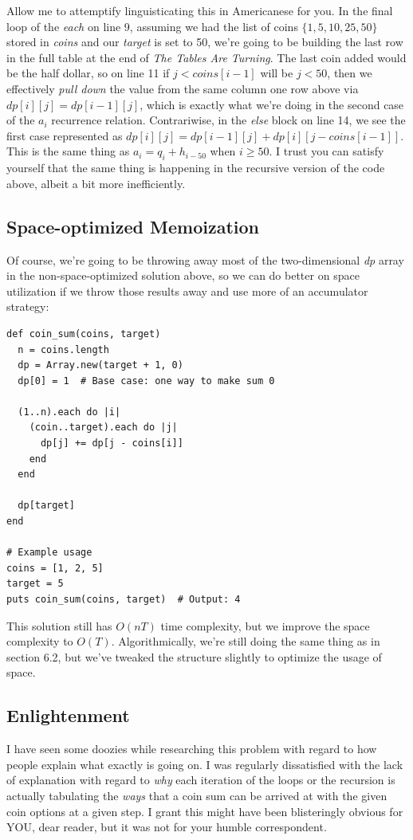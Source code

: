 \noindent Allow me to attemptify linguisticating this in Americanese for you.  In the final loop of the \textit{each} on line 9, assuming we had the list of coins $\{1, 5, 10, 25, 50\}$ stored in \textit{coins} and our \textit{target} is set to 50, we're going to be building the last row in the full table at the end of \textit{The Tables Are Turning}.  The last coin added would be the half dollar, so on line 11 if $j < coins[i-1]$ will be $j < 50$, then we effectively \textit{pull down} the value from the same column one row above via $dp[i][j] = dp[i - 1][j]$, which is exactly what we're doing in the second case of the $a_i$ recurrence relation.  Contrariwise, in the \textit{else} block on line 14, we see the first case represented as $dp[i][j] = dp[i - 1][j] + dp[i][j - coins[i - 1]]$.  This is the same thing as $a_i = q_i + h_{i-50}$ when $i\ge50$.  I trust you can satisfy yourself that the same thing is happening in the recursive version of the code above, albeit a bit more inefficiently.

\subsection{Space-optimized Memoization}
Of course, we're going to be throwing away most of the two-dimensional \textit{dp} array in the non-space-optimized solution above, so we can do better on space utilization if we throw those results away and use more of an accumulator strategy:
\begin{lstlisting}
def coin_sum(coins, target)
  n = coins.length
  dp = Array.new(target + 1, 0)
  dp[0] = 1  # Base case: one way to make sum 0

  (1..n).each do |i|
    (coin..target).each do |j|
      dp[j] += dp[j - coins[i]]
    end
  end

  dp[target]
end

# Example usage
coins = [1, 2, 5]
target = 5
puts coin_sum(coins, target)  # Output: 4
\end{lstlisting}
This solution still has $O(nT)$ time complexity, but we improve the space complexity to $O(T)$.  Algorithmically, we're still doing the same thing as in section 6.2, but we've tweaked the structure slightly to optimize the usage of space.

\subsection{Enlightenment}
I have seen some doozies while researching this problem with regard to how people explain what exactly is going on.  I was regularly dissatisfied with the lack of explanation with regard to \textit{why} each iteration of the loops or the recursion is actually tabulating the \textit{ways} that a coin sum can be arrived at with the given coin options at a given step.  I grant this might have been blisteringly obvious for YOU, dear reader, but it was not for your humble correspondent.  

